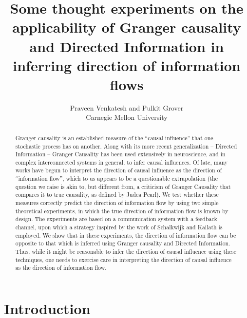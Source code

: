\documentclass[conference]{IEEEtran}
\begin{document}
%
\title{Some thought experiments on the applicability of Granger causality and Directed Information in inferring direction of information flows}
\author{Praveen Venkatesh and Pulkit Grover\\Carnegie Mellon University}

\maketitle


\begin{abstract}
	Granger causality is an established measure of the ``causal influence'' that one stochastic process has on another. Along with its more recent generalization -- Directed Information -- Granger Causality has been used extensively in neuroscience, and in complex interconnected systems in general, to infer causal influences. Of late, many works have begun to interpret the direction of causal influence as the direction of ``information flow'', which to us appears to be a questionable extrapolation {\color{red}(the question we raise is akin to, but different from, a criticism of Granger Causality that compares it to true causality, as defined by Judea Pearl)}. We test whether these measures correctly predict the direction of information flow by using two simple theoretical experiments, in which the true direction of information flow is known by design. The experiments are based on a communication system with a feedback channel, upon which a strategy inspired by the work of Schalkwijk and Kailath is employed. We show that in these experiments, the direction of information flow can be opposite to that which is inferred using Granger causality and Directed Information. Thus, while it might be reasonable to infer the direction of causal influence using these techniques, one needs to exercise care in interpreting the direction of causal influence as the direction of information flow.
\end{abstract}

\IEEEpeerreviewmaketitle


\section{Introduction}
\label{sec:intro}
\end{document}
